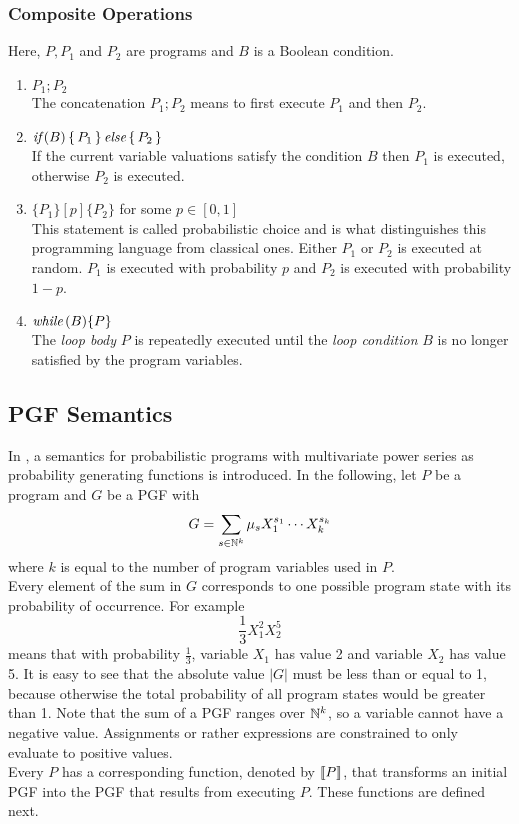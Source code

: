 \subsubsection*{Composite Operations}
Here, $P, P_1$ and $P_2$ are programs and $B$ is a Boolean condition.
\begin{enumerate}
	\item ${P_1; P_2}$ \vspace{0.3\baselineskip} \\
		The concatenation $P_1; P_2$ means to first execute $P_1$ and then $P_2$.
	\item $\textit{if}\,(B) \, \{ \, P_1 \, \} \, \textit{else} \, \{ \, P_2 \, \}$ \vspace{0.3\baselineskip} \\
		If the current variable valuations satisfy the condition $B$ then $P_1$ is executed, otherwise $P_2$ is executed.
	\item $\{P_1\}[p]\{P_2\}$ for some $p \in [0, 1]$ \vspace{0.3\baselineskip} \\
		This statement is called probabilistic choice and is what distinguishes this programming language from classical ones.
		Either $P_1$ or $P_2$ is executed at random.
		$P_1$ is executed with probability $p$ and $P_2$ is executed with probability $1-p$.
	\item $\textit{while}\,(B) \{P\}$ \vspace{0.3\baselineskip} \\
		The \emph{loop body} $P$ is repeatedly executed until the \emph{loop condition} $B$ is no longer satisfied by the program variables.
\end{enumerate}

\subsection{PGF Semantics}
In \cite{clara:pgf}, a semantics for probabilistic programs with multivariate power series as probability generating functions is introduced.
In the following, let $P$ be a program and $G$ be a PGF with
\[ G = \sum\limits_{s \in \mathbb{N}^k} \mu_s X_1^{s_1} \cdots X_k^{s_k} \]
where $k$ is equal to the number of program variables used in $P$. \\
Every element of the sum in $G$ corresponds to one possible program state with its probability of occurrence.
For example \[ \frac{1}{3} X_1^2 X_2^5 \] means that with probability $\frac{1}{3}$, variable $X_1$ has value 2 and variable $X_2$ has value 5.
It is easy to see that the absolute value $|G|$ must be less than or equal to 1, because otherwise the total probability of all program states would be greater than 1.
Note that the sum of a PGF ranges over $\mathbb{N}^k$, so a variable cannot have a negative value.
Assignments or rather expressions are constrained to only evaluate to positive values. \\
Every $P$ has a corresponding function, denoted by $\left\llbracket P \right\rrbracket$, that transforms an initial PGF into the PGF that results from executing $P$.
These functions are defined next.
